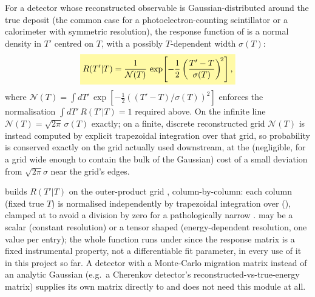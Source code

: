 
\begin{theorybox}
For a detector whose reconstructed observable is Gaussian-distributed
around the true deposit (the common case for a photoelectron-counting
scintillator or a calorimeter with symmetric resolution), the response
function of  is a normal density in $T'$
centred on $T$, with a possibly $T$-dependent width $\sigma(T)$:
\begin{equation}
  \keyresult{R(T'|T) = \frac{1}{\mathcal{N}(T)}\,
    \exp\!\left[-\frac{1}{2}\left(\frac{T'-T}{\sigma(T)}\right)^{\!2}\right],}
\end{equation}
where $\mathcal{N}(T)=\int dT'\,\exp[-\tfrac12((T'-T)/\sigma(T))^2]$
enforces the normalisation $\int dT'\,R(T'|T)=1$ required above. On the
infinite line $\mathcal{N}(T)=\sqrt{2\pi}\,\sigma(T)$ exactly; on a finite,
discrete reconstructed grid $\mathcal{N}(T)$ is instead computed by explicit
trapezoidal integration over that grid, so probability is conserved exactly
on the grid actually used downstream, at the (negligible, for a grid wide
enough to contain the bulk of the Gaussian) cost of a small deviation from
$\sqrt{2\pi}\sigma$ near the grid's edges.
\end{theorybox}

\begin{implbox}
 builds $R(T'|T)$ on the outer-product grid
, column-by-column: each column
(fixed true $T$) is normalised independently by trapezoidal integration over
 (), clamped at
 to avoid a division by zero for a pathologically
narrow .  may be a scalar (constant
resolution) or a tensor shaped  (energy-dependent resolution,
one value per  entry); the whole function runs under
 since the response matrix is a fixed instrumental
property, not a differentiable fit parameter, in every use of it in this
project so far. A detector with a Monte-Carlo migration matrix instead of an
analytic Gaussian (e.g.\ a Cherenkov detector's reconstructed-vs-true-energy
matrix) supplies its own matrix directly to
 and does not need this module at all.
\end{implbox}

